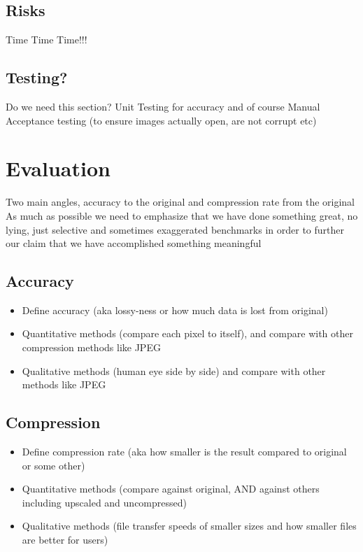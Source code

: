 \documentclass[14pt]{article}
\begin{document}
    \subsection{Risks}

    Time Time Time!!!

    \subsection{Testing?}

    Do we need this section?
    \linebreak
    Unit Testing for accuracy and of course Manual Acceptance testing (to ensure images actually open, are not corrupt etc)


    \section{Evaluation}

    Two main angles, accuracy to the original and compression rate from the original
    \linebreak
    As much as possible we need to emphasize that we have done something great,
    no lying, just selective and sometimes exaggerated benchmarks in order to further our claim that we
    have accomplished something meaningful

    \subsection{Accuracy}

    \begin{itemize}
        \item Define accuracy (aka lossy-ness or how much data is lost from original)
        \item Quantitative methods (compare each pixel to itself), and compare with other compression methods like JPEG
        \item Qualitative methods (human eye side by side) and compare with other methods like JPEG
    \end{itemize}

    \subsection{Compression}

    \begin{itemize}
        \item Define compression rate (aka how smaller is the result compared to original or some other)
        \item Quantitative methods (compare against original, AND against others including upscaled and uncompressed)
        \item Qualitative methods (file transfer speeds of smaller sizes and how smaller files are better for users)
    \end{itemize}
\end{document}

